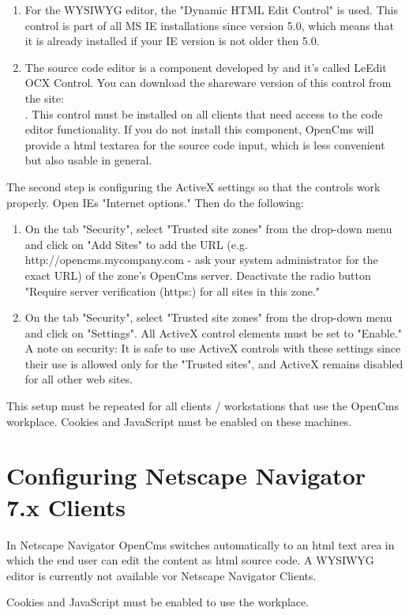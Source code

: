 \begin{enumerate}
\item For the WYSIWYG editor, the "Dynamic HTML Edit Control" is
used. This control is part of all MS IE installations since
version 5.0, which means that it is already installed if your IE version 
is not older then 5.0. 

\item The source code editor is a component developed by 
     and it's
called LeEdit OCX Control. You can download the shareware version
of this control from the site:\\
.
This control must be installed on all clients that need access to
the code editor functionality.
If you do not install this component, OpenCms will provide a html
textarea for the source code input, which is less convenient but
also usable in general.
\end{enumerate}

The second step is configuring the ActiveX settings so that the
controls work properly. Open IEs "Internet options." Then do the
following:

\begin{enumerate}
\item On the tab "Security", select "Trusted site zones" from the
drop-down menu and click on "Add Sites" to add the URL (e.g.
http://opencms.mycompany.com - ask your system administrator for
the exact URL) of the zone's OpenCms server. Deactivate the radio
button "Require server verification (https:) for all sites in this
zone."
\item On the tab "Security", select "Trusted site zones"
from the drop-down menu and click on "Settings". All ActiveX
control elements must be set to "Enable." A note on security: It
is safe to use ActiveX controls with these settings since their
use is allowed only for the "Trusted sites", and ActiveX remains
disabled for all other web sites.
\end{enumerate}

This setup must be repeated for all clients / workstations that
use the OpenCms workplace. Cookies and JavaScript must be enabled 
on these machines.


\section{Configuring Netscape Navigator 7.x Clients}

In Netscape Navigator OpenCms switches automatically to an html 
text area in which the end user can edit the content as html 
source code. A WYSIWYG editor is currently not available vor
Netscape Navigator Clients.

Cookies and JavaScript must be enabled to use the workplace.
